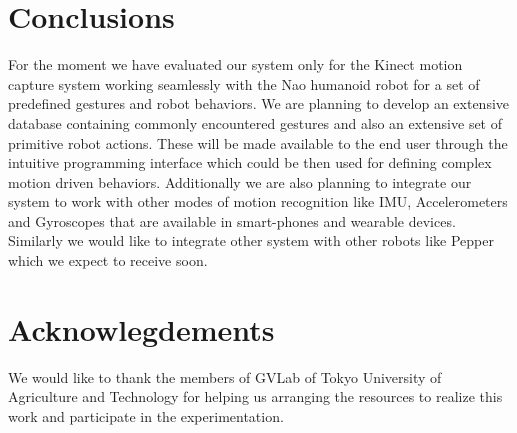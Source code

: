 \documentclass{llncs}
\begin{document}
\section{Conclusions}
%
For the moment we have evaluated our system only for the Kinect motion capture system working seamlessly with the Nao humanoid robot for a set of predefined gestures and robot behaviors. We are planning to develop an extensive database containing commonly encountered gestures and also an extensive set of primitive robot actions. These will be made available to the end user through the intuitive programming interface which could be then used for defining complex motion driven behaviors. Additionally we are also planning to integrate our system to work with other modes of motion recognition like IMU, Accelerometers and Gyroscopes that are available in smart-phones and wearable devices. Similarly we would like to integrate other system with other robots like Pepper which we expect to receive soon.
%
\section{Acknowlegdements}
%
		We would like to thank the members of GVLab of Tokyo University of Agriculture and Technology for helping us arranging the resources to realize this work and participate in the experimentation.
%
%
%


%
%
%
%

\end{document}

